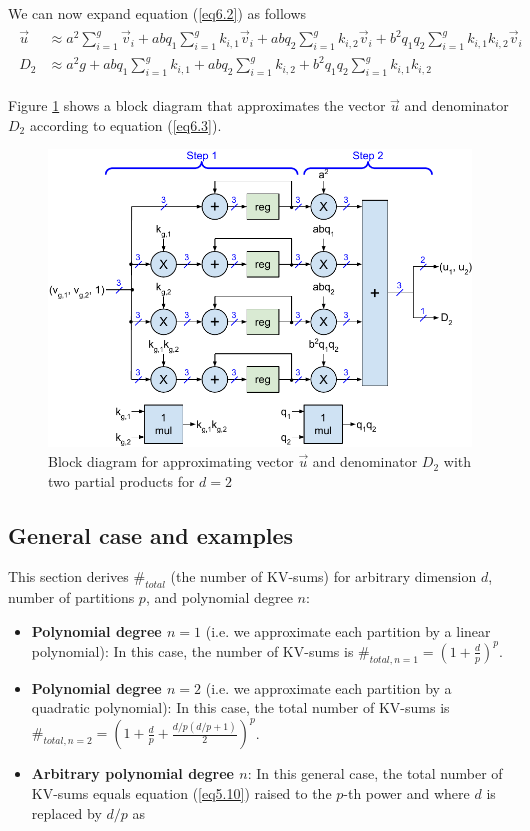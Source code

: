 \documentclass{article}
\numberwithin{equation}{section} %
\def\v{\vec{v}}
\def\u{\vec{u}}
\begin{document}
We can now expand equation (\ref{eq6.2}) as follows
\begin{align} \begin{split}
  \u  &\approx a^2 \sum_{i=1}^g \v_i
           + abq_1 \sum_{i=1}^g k_{i,1} \v_i
           + abq_2 \sum_{i=1}^g k_{i,2} \v_i
     + b^2 q_1 q_2 \sum_{i=1}^g k_{i,1} k_{i,2} \v_i \\
  D_2 &\approx a^2 g
           + abq_1 \sum_{i=1}^g k_{i,1}
           + abq_2 \sum_{i=1}^g k_{i,2}
     + b^2 q_1 q_2 \sum_{i=1}^g k_{i,1} k_{i,2}
\label{eq6.3} \end{split} \end{align}

Figure \ref{fig6} shows a block diagram that approximates the vector $\u$ and denominator $D_2$ according to equation (\ref{eq6.3}).

\begin{figure}[h!] \centering  %
  \includegraphics[scale=0.86]{figs/approximate_fig6.pdf}
  \caption{Block diagram for approximating vector $\u$ and denominator $D_2$ with two partial products for $d = 2$}
\label{fig6} \end{figure}

\subsection{General case and examples}
This section derives $\#_{total}$ (the number of KV-sums) for arbitrary dimension $d$, number of partitions $p$, and polynomial degree $n$:
\begin{itemize}[topsep=-1pt, itemsep=-1pt]
  \item \textbf{Polynomial degree $n = 1$} (i.e. we approximate each partition by a linear polynomial): In this case, the number of KV-sums is $\#_{total, n=1} = (1+ \frac{d}{p})^p$.
  \item \textbf{Polynomial degree $n = 2$} (i.e. we approximate each partition by a quadratic polynomial):
In this case, the total number of KV-sums is $\#_{total, n=2} = (1 + \frac{d}{p} + \frac{d/p(d/p+1)}{2})^p$.
  \item \textbf{Arbitrary polynomial degree $n$}: In this general case, the total number of KV-sums equals equation (\ref{eq5.10}) raised to the $p$-th power and where $d$ is replaced by $d/p$ as
\end{itemize}
\end{document}
